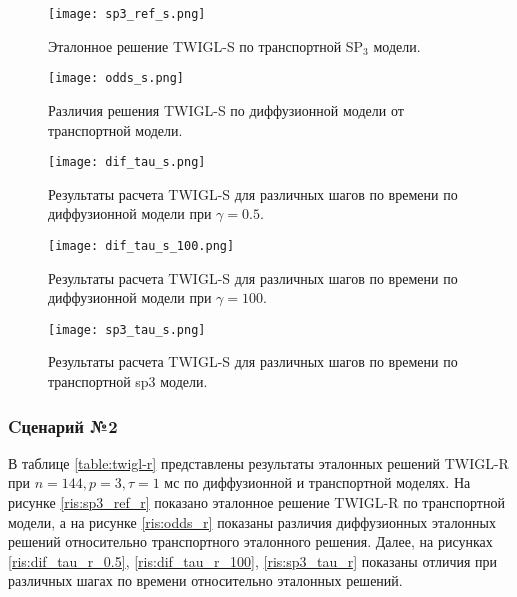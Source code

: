 \documentclass[a4paper,12pt]{article}
\begin{document}
\begin{figure}[htp]
\begin{center}
	\texttt{[image: sp3\_ref\_s.png]}\\
	\caption{\label{image:canonsummary} Эталонное решение TWIGL-S по транспортной SP$_3$ модели.}
	\label{ris:sp3_ref_s}
\end{center}
\end{figure}

\begin{figure}[htp]
\begin{center}
	\texttt{[image: odds\_s.png]}\\
	\caption{\label{image:canonsummary} Различия решения TWIGL-S по диффузионной модели от транспортной модели.}
	\label{ris:odds_s}
\end{center}
\end{figure}

\begin{figure}[htp]
\begin{center}
	\texttt{[image: dif\_tau\_s.png]}\\
	\caption{\label{image:canonsummary} Результаты расчета TWIGL-S для различных шагов по времени по диффузионной модели при $\gamma=0.5$.}
	\label{ris:dif_tau_s_0.5}
\end{center}
\end{figure}

\begin{figure}[htp]
\begin{center}
	\texttt{[image: dif\_tau\_s\_100.png]}\\
	\caption{\label{image:canonsummary} Результаты расчета TWIGL-S для различных шагов по времени по диффузионной модели при $\gamma=100$.}
	\label{ris:dif_tau_s_100}
\end{center}
\end{figure}

\begin{figure}[htp]
\begin{center}
	\texttt{[image: sp3\_tau\_s.png]}\\
	\caption{\label{image:canonsummary} Результаты расчета TWIGL-S для различных шагов по времени по транспортной sp3 модели.}
	\label{ris:sp3_tau_s}
\end{center}
\end{figure}

\pagebreak
\newpage

\subsubsection{Cценарий №2}
В таблице \ref{table:twigl-r} представлены результаты эталонных решений TWIGL-R при $n=144, p=3, \tau=1$ мс по диффузионной и транспортной моделях.
На рисунке \ref{ris:sp3_ref_r} показано эталонное решение TWIGL-R по транспортной модели, а на рисунке \ref{ris:odds_r} показаны различия диффузионных эталонных решений относительно транспортного эталонного решения. 
Далее, на рисунках \ref{ris:dif_tau_r_0.5}, \ref{ris:dif_tau_r_100}, \ref{ris:sp3_tau_r} показаны отличия при различных шагах по времени относительно эталонных решений.
\end{document}
